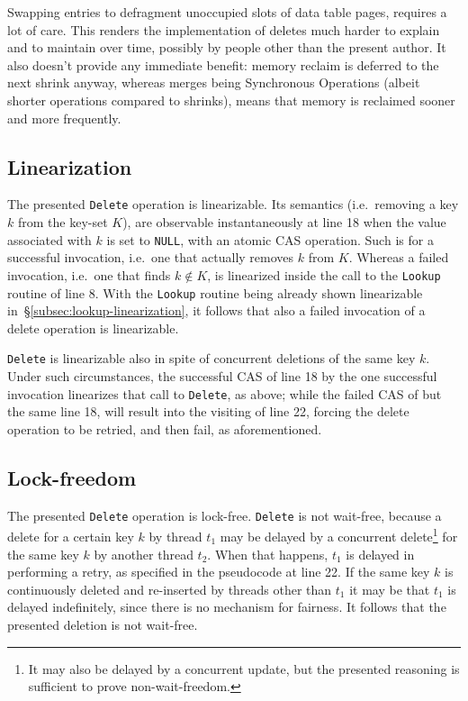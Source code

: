 Swapping entries to defragment unoccupied slots of data table pages, requires a lot of care.
This renders the implementation of deletes much harder to explain and to maintain over time, possibly by people other than the present author.
It also doesn't provide any immediate benefit: memory reclaim is deferred to the next shrink anyway, whereas merges being Synchronous Operations (albeit shorter operations compared to shrinks), means that memory is reclaimed sooner and more frequently.



\subsection{Linearization}\label{subsec:delete-linearization}

The presented \texttt{Delete} operation is linearizable.
Its semantics (i.e.\ removing a key $k$ from the key-set $K$), are observable instantaneously at line 18 when the value associated with $k$ is set to \texttt{NULL}, with an atomic CAS operation.
Such is for a successful invocation, i.e.\ one that actually removes $k$ from $K$.
Whereas a failed invocation, i.e.\ one that finds $k \not\in K$, is linearized inside the call to the \texttt{Lookup} routine of line 8.
With the \texttt{Lookup} routine being already shown linearizable in~\S\ref{subsec:lookup-linearization}, it follows that also a failed invocation of a delete operation is linearizable.

\texttt{Delete} is linearizable also in spite of concurrent deletions of the same key $k$.
Under such circumstances, the successful CAS of line 18 by the one successful invocation linearizes that call to \texttt{Delete}, as above; while the failed CAS of but the same line 18, will result into the visiting of line 22, forcing the delete operation to be retried, and then fail, as aforementioned.


\subsection{Lock-freedom}\label{subsec:delete-lock-freedom}

The presented \texttt{Delete} operation is lock-free.
\texttt{Delete} is not wait-free, because a delete for a certain key $k$ by thread $t_1$ may be delayed by a concurrent delete\footnote{%
	It may also be delayed by a concurrent update, but the presented reasoning is sufficient to prove non-wait-freedom.
} for the same key $k$ by another thread $t_2$.
When that happens, $t_1$ is delayed in performing a retry, as specified in the pseudocode at line 22.
If the same key $k$ is continuously deleted and re-inserted by threads other than $t_1$ it may be that $t_1$ is delayed indefinitely, since there is no mechanism for fairness.
It follows that the presented deletion is not wait-free.


